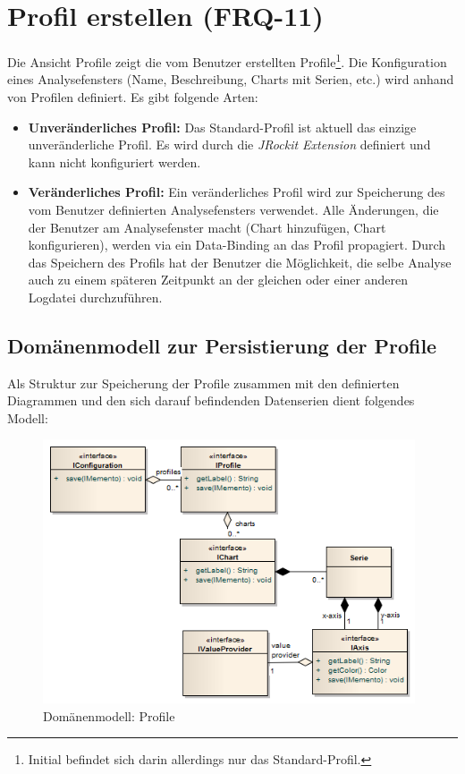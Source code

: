 \section{Profil erstellen (FRQ-11)}
Die Ansicht Profile zeigt die vom Benutzer erstellten Profile\footnote{Initial befindet sich darin allerdings nur das Standard-Profil.}. Die Konfiguration eines Analysefensters (Name, Beschreibung, Charts mit Serien, etc.) wird anhand von Profilen definiert. Es gibt folgende  Arten:
\begin{itemize}
	\item \textbf{Unveränderliches Profil:} Das Standard-Profil ist aktuell das einzige unveränderliche Profil. Es wird durch die \textit{JRockit Extension} definiert und kann nicht konfiguriert werden.
	\item \textbf{Veränderliches Profil:} Ein veränderliches Profil wird zur Speicherung des vom Benutzer definierten Analysefensters verwendet. Alle Änderungen, die der Benutzer am Analysefenster macht (Chart hinzufügen, Chart konfigurieren), werden via ein Data-Binding an das Profil propagiert. Durch das Speichern des Profils hat der Benutzer die Möglichkeit, die selbe Analyse auch zu einem späteren Zeitpunkt an der gleichen oder einer anderen Logdatei durchzuführen.
\end{itemize}

\subsection{Domänenmodell zur Persistierung der Profile}
Als Struktur zur Speicherung der Profile zusammen mit den definierten Diagrammen und den sich darauf befindenden Datenserien dient folgendes Modell:
 \begin{figure}[H]
  	\centering
    	\includegraphics[width=11cm]{images/core_domain_profiles}
        	\caption{Domänenmodell: Profile}
\end{figure}

